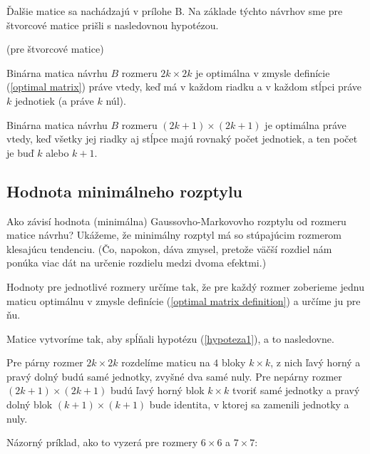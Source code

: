 Ďalšie matice sa nachádzajú v prílohe B. Na základe týchto návrhov sme pre štvorcové matice prišli s nasledovnou hypotézou.

\begin{hypoteza}
\label{hypoteza1}
(pre štvorcové matice)

Binárna matica návrhu $B$ rozmeru $2k \times 2k$ je optimálna v zmysle definície (\ref{optimal matrix}) práve vtedy, 
keď má v každom riadku a v každom stĺpci práve $k$ jednotiek (a práve $k$ núl).

Binárna matica návrhu $B$ rozmeru $(2k + 1) \times (2k + 1)$ je optimálna práve vtedy, 
keď všetky jej riadky aj stĺpce majú rovnaký počet jednotiek, a ten počet je buď $k$ alebo $k + 1$.
\end{hypoteza}

\subsection{Hodnota minimálneho rozptylu}

Ako závisí hodnota (minimálna) Gaussovho-Markovovho rozptylu od rozmeru matice návrhu? 
Ukážeme, že minimálny rozptyl má so stúpajúcim rozmerom klesajúcu tendenciu. 
(Čo, napokon, dáva zmysel, pretože väčší rozdiel nám ponúka viac dát na určenie rozdielu medzi dvoma efektmi.)

Hodnoty pre jednotlivé rozmery určíme tak, že pre každý rozmer zoberieme jednu maticu optimálnu 
v zmysle definície (\ref{optimal matrix definition}) a určíme ju pre ňu.

Matice vytvoríme tak, aby spĺňali hypotézu (\ref{hypoteza1}), a to nasledovne.

Pre párny rozmer $2k \times 2k$ rozdelíme maticu na $4$ bloky $k \times k$, 
z nich ľavý horný a pravý dolný budú samé jednotky, zvyšné dva samé nuly. 
Pre nepárny rozmer $(2k + 1) \times (2k + 1)$ budú ľavý horný blok $k \times k$ tvoriť samé jednotky 
a pravý dolný blok $(k + 1) \times (k + 1)$ bude identita, v ktorej sa zamenili jednotky a nuly.

Názorný príklad, ako to vyzerá pre rozmery $6 \times 6$ a $7 \times 7$:

